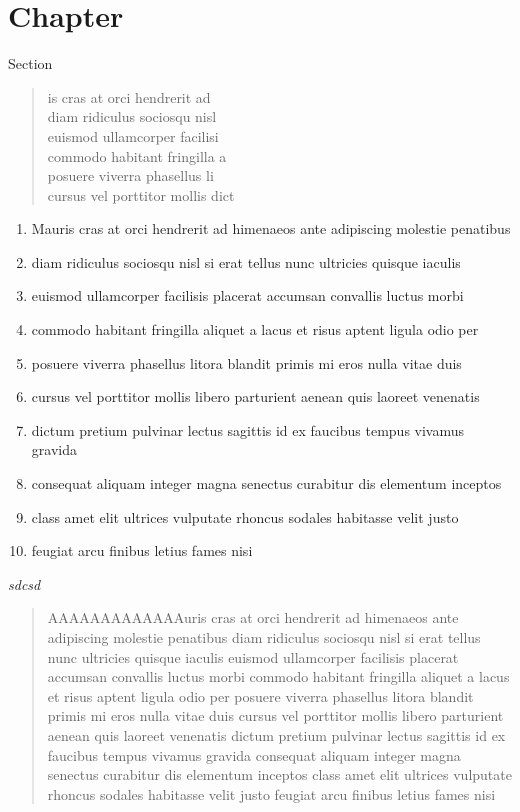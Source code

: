 \hypertarget{chapter}{%
\section{Chapter}\label{chapter}}

\begin{frame}{Section}
\protect\hypertarget{section}{}
\begin{quote}
is cras at orci hendrerit ad\\
diam ridiculus sociosqu nisl\\
euismod ullamcorper facilisi\\
commodo habitant fringilla a\\
posuere viverra phasellus li\\
cursus vel porttitor mollis dict
\end{quote}

\begin{enumerate}
\item
  Mauris cras at orci hendrerit ad himenaeos ante adipiscing molestie
  penatibus
\item
  diam ridiculus sociosqu nisl si erat tellus nunc ultricies quisque
  iaculis
\item
  euismod ullamcorper facilisis placerat accumsan convallis luctus morbi
\item
  commodo habitant fringilla aliquet a lacus et risus aptent ligula odio
  per
\item
  posuere viverra phasellus litora blandit primis mi eros nulla vitae
  duis
\item
  cursus vel porttitor mollis libero parturient aenean quis laoreet
  venenatis
\item
  dictum pretium pulvinar lectus sagittis id ex faucibus tempus vivamus
  gravida
\item
  consequat aliquam integer magna senectus curabitur dis elementum
  inceptos
\item
  class amet elit ultrices vulputate rhoncus sodales habitasse velit
  justo
\item
  feugiat arcu finibus letius fames nisi
\end{enumerate}

\emph{sdcsd}

\begin{quote}
AAAAAAAAAAAAAuris cras at orci hendrerit ad himenaeos ante adipiscing
molestie penatibus diam ridiculus sociosqu nisl si erat tellus nunc
ultricies quisque iaculis euismod ullamcorper facilisis placerat
accumsan convallis luctus morbi commodo habitant fringilla aliquet a
lacus et risus aptent ligula odio per posuere viverra phasellus litora
blandit primis mi eros nulla vitae duis cursus vel porttitor mollis
libero parturient aenean quis laoreet venenatis dictum pretium pulvinar
lectus sagittis id ex faucibus tempus vivamus gravida consequat aliquam
integer magna senectus curabitur dis elementum inceptos class amet elit
ultrices vulputate rhoncus sodales habitasse velit justo feugiat arcu
finibus letius fames nisi
\end{quote}


\end{frame}
